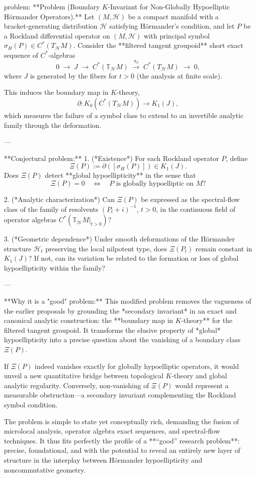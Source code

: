 problem:  
**Problem (Boundary \(K\)-Invariant for Non‑Globally Hypoelliptic Hörmander Operators).**  
Let \( (M,\mathcal H) \) be a compact manifold with a bracket‑generating distribution \(\mathcal H\) satisfying Hörmander’s condition, and let \(P\) be a Rockland differential operator on \((M,\mathcal H)\) with principal symbol \(\sigma_H(P)\in C^*(T_{\mathcal H}M)\).  
Consider the **filtered tangent groupoid** short exact sequence of \(C^*\)-algebras  
\[
0 \;\longrightarrow\; J \;\longrightarrow\; C^*(\mathbb T_{\mathcal H}M) \;\xrightarrow{\pi_0}\; C^*(T_{\mathcal H}M) \;\longrightarrow\; 0,
\]
where \(J\) is generated by the fibers for \(t>0\) (the analysis at finite scale).

This induces the boundary map in \(K\)-theory,
\[
\partial: K_0(C^*(T_{\mathcal H}M))\longrightarrow K_1(J),
\]
which measures the failure of a symbol class to extend to an invertible analytic family through the deformation.

---

**Conjectural problem:**  
1. (*Existence*) For each Rockland operator \(P\), define  
\[
\Xi(P) := \partial([\sigma_H(P)]) \in K_1(J).
\]  
Does \(\Xi(P)\) detect **global hypoellipticity** in the sense that  
\[
\Xi(P)=0 \quad\Longleftrightarrow\quad P\text{ is globally hypoelliptic on }M?
\]

2. (*Analytic characterization*) Can \(\Xi(P)\) be expressed as the spectral‐flow class of the family of resolvents  
\((P_t+i)^{-1}\), \(t>0\),  
in the continuous field of operator algebras \(C^*(\mathbb T_{\mathcal H}M|_{t>0})\)?  

3. (*Geometric dependence*) Under smooth deformations of the Hörmander structure \(\mathcal H_t\) preserving the local nilpotent type, does \(\Xi(P_t)\) remain constant in \(K_1(J)\)? If not, can its variation be related to the formation or loss of global hypoellipticity within the family?

---

**Why it is a "good" problem:**  
This modified problem removes the vagueness of the earlier proposals by grounding the *secondary invariant* in an exact and canonical analytic construction: the **boundary map in \(K\)-theory** for the filtered tangent groupoid. It transforms the elusive property of *global* hypoellipticity into a precise question about the vanishing of a boundary class \(\Xi(P)\).  

If \(\Xi(P)\) indeed vanishes exactly for globally hypoelliptic operators, it would unveil a new quantitative bridge between topological \(K\)-theory and global analytic regularity.  Conversely, non‑vanishing of \(\Xi(P)\) would represent a measurable obstruction—a secondary invariant complementing the Rockland symbol condition.  

The problem is simple to state yet conceptually rich, demanding the fusion of microlocal analysis, operator algebra exact sequences, and spectral‑flow techniques.  It thus fits perfectly the profile of a **“good” research problem**: precise, foundational, and with the potential to reveal an entirely new layer of structure in the interplay between Hörmander hypoellipticity and noncommutative geometry.
